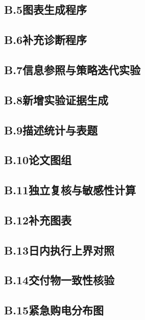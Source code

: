 \documentclass[UTF8,fontset=none,a4paper,zihao=-4]{ctexart}
\begin{document}
\subsection*{B.5\quad 图表生成程序}

\subsection*{B.6\quad 补充诊断程序}

\subsection*{B.7\quad 信息参照与策略迭代实验}

\subsection*{B.8\quad 新增实验证据生成}

\subsection*{B.9\quad 描述统计与表题}

\subsection*{B.10\quad 论文图组}

\subsection*{B.11\quad 独立复核与敏感性计算}

\subsection*{B.12\quad 补充图表}

\subsection*{B.13\quad 日内执行上界对照}

\subsection*{B.14\quad 交付物一致性核验}

\subsection*{B.15\quad 紧急购电分布图}

\end{document}
